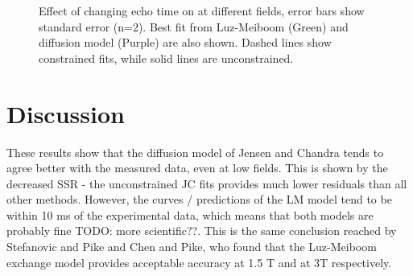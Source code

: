 \begin{figure}[h!t]

  \caption[Luz-Meiboom and diffusion model fits at different fields]{Effect of changing echo time on \Ttwo at different fields, error bars show standard error (n=2). Best fit from Luz-Meiboom (Green) and diffusion model (Purple) are also shown. Dashed lines show constrained fits, while solid lines are unconstrained.}
  \label{fig:dm-fitResults}
\end{figure}

\section{Discussion}
These results show that the diffusion model of Jensen and Chandra tends to agree better with the measured data, even at low fields.
This is shown by the decreased SSR - the unconstrained JC fits provides much lower residuals than all other methods.
However, the curves / predictions of the LM model tend to be within 10 ms of the experimental data, which means that both models are probably fine TODO: more scientific??.
This is the same conclusion reached by Stefanovic and Pike and Chen and Pike, who found that the Luz-Meiboom exchange model provides acceptable accuracy at 1.5 T and at 3T respectively.

